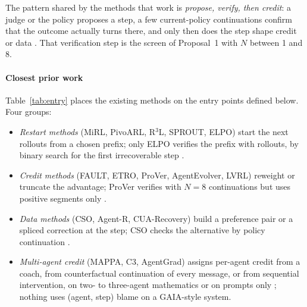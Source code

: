 The pattern shared by the methods that work is \emph{propose, verify, then credit}: a judge or the policy proposes a step, a few current-policy continuations confirm that the outcome actually turns there, and only then does the step shape credit or data \cite{liang2026elpo,jung2026prover,li2026cso,chu2026agentgrad}. That verification step is the screen of Proposal~1 with $N$ between 1 and 8.

\paragraph{Closest prior work} Table~\ref{tab:entry} places the existing methods on the entry points defined below. Four groups:
\begin{itemize}[leftmargin=1.1em]
\item \emph{Restart methods} (MiRL, PivoARL, R$^3$L, SPROUT, ELPO) start the next rollouts from a chosen prefix; only ELPO verifies the prefix with rollouts, by binary search for the first irrecoverable step \cite{liang2026elpo}.
\item \emph{Credit methods} (FAULT, ETRO, ProVer, AgentEvolver, LVRL) reweight or truncate the advantage; ProVer verifies with $N=8$ continuations but uses positive segments only \cite{jung2026prover}.
\item \emph{Data methods} (CSO, Agent-R, CUA-Recovery) build a preference pair or a spliced correction at the step; CSO checks the alternative by policy continuation \cite{li2026cso}.
\item \emph{Multi-agent credit} (MAPPA, C3, AgentGrad) assigns per-agent credit from a coach, from counterfactual continuation of every message, or from sequential intervention, on two- to three-agent mathematics or on prompts only \cite{li2026mappa,chen2026c3,chu2026agentgrad}; nothing uses (agent, step) blame on a GAIA-style system.
\end{itemize}

